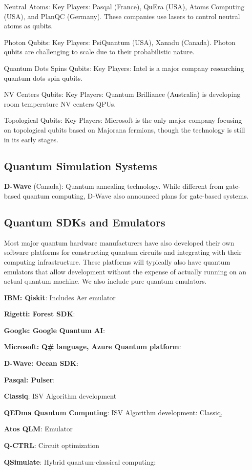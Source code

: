 Neutral Atoms:  Key Players: Pasqal (France), QuEra (USA), Atoms Computing (USA), and PlanQC (Germany).
 These companies use lasers to control neutral atoms as qubits.

Photon Qubits: Key Players: PsiQuantum (USA), Xanadu (Canada).
 Photon qubits are challenging to scale due to their probabilistic nature.

Quantum Dots Spins Qubits: Key Players: Intel is a major company researching quantum dots spin qubits.

NV Centers Qubits: Key Players: Quantum Brilliance (Australia) is developing room temperature NV centers QPUs.

Topological Qubits: Key Players: Microsoft is the only major company focusing on topological qubits based on Majorana fermions, though the technology is still in its early stages.


\subsection{Quantum Simulation Systems}

\begin{enumeration}
\item \textbf{D-Wave} (Canada): Quantum annealing technology.  While different from gate-based quantum computing,
  D-Wave also announced plans for gate-based systems.
\end{enumeration}


\subsection{Quantum SDKs and Emulators}

Most major quantum hardware manufacturers have also developed their own software platforms for constructing quantum
circuits and integrating with their computing infrastructure.
These platforms will typically also have quantum emulators that allow development without the expense of actually
running on an actual quantum machine.
We also include pure quantum emulators.

\begin{enumeration}
\item \textbf{IBM: Qiskit}: Includes Aer emulator
\item \textbf{Rigetti: Forest SDK}:
\item \textbf{Google: Google Quantum AI}:
\item \textbf{Microsoft: Q# language, Azure Quantum platform}:
\item \textbf{D-Wave: Ocean SDK}:
\item \textbf{Pasqal: Pulser}:
\item \textbf{Classiq}: ISV Algorithm development
\item \textbf{QEDma Quantum Computing}: ISV Algorithm development: Classiq, 
\item \textbf{Atos QLM}: Emulator
\item \textbf{Q-CTRL}: Circuit optimization
\item \textbf{QSimulate}: Hybrid quantum-classical computing: 
\end{enumeration}


